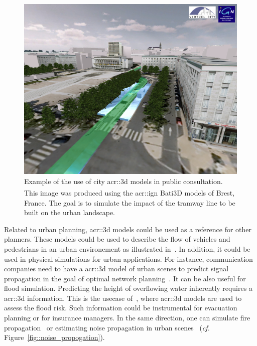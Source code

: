             \begin{figure}[htpb]
                \centering
                \includegraphics[width=\textwidth]{images/introduction/3d_model_applications/brest_tramway}
                \caption[
                    Example of the use of city \acrshort*{acr::3d} models in public consultation.
                ]{
                    \label{fig::public_consultation}
                    Example of the use of city \gls{acr::3d} models in public consultation.
                    This image was produced using the \gls{acr::ign} Bati3D\textsuperscript{\textregistered} models of Brest, France.
                    The goal is to simulate the impact of the tramway line to be built on the urban landscape.
                }
            \end{figure}

            Related to urban planning, \gls{acr::3d} models could be used as a reference for other planners.
            These models could be used to describe the flow of vehicles and pedestrians in an urban environement as illustrated in~\textcite{vanhoey2017varcity}.
            In addition, it could be used in physical simulations for urban applications.
            For instance, communication companies need to have a \gls{acr::3d} model of urban scenes to predict signal propagation in the goal of optimal network planning~\parencite{yun2007radio}.
            It can be also useful for flood simulation.
            Predicting the height of overflowing water inherently requires a \gls{acr::3d} information.
            This is the usecase of~\textcite{varduhn2015multi}, where \gls{acr::3d} models are used to assess the flood risk.
            Such information could be instrumental for evacuation planning or for insurance managers.
            In the same direction, one can simulate fire propagation~\parencite{dimitropoulos2010fire} or estimating noise propagation in urban scenes~\parencite{stoter20083d} (\textit{cf.} Figure~\ref{fig::noise_propogation}).

